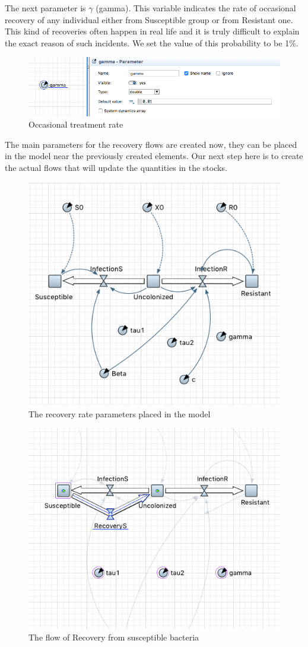The next parameter is $\gamma$ (gamma). This variable indicates the rate of occasional recovery of any individual either from Susceptible group or from Resistant one. This kind of recoveries often happen in real life and it is truly difficult to explain the exact reason of such incidents. We set the value of this probability to be 1\%.

\begin{figure}[H]
  \centering
  \includegraphics[height=0.25\textwidth]{img/screens/recovery/recovery4}
  \caption{Occasional treatment rate}
\end{figure}

The main parameters for the recovery flows are created now, they can be placed in the model near the previously created elements. Our next step here is to create the actual flows that will update the quantities in the stocks.

\begin{figure}[H]
  \centering
  \includegraphics[height=0.5\textwidth]{img/screens/recovery/recovery3}
  \caption{The recovery rate parameters placed in the model}
\end{figure}


\begin{figure}[H]
  \centering
  \includegraphics[height=0.5\textwidth]{img/screens/recovery/recovery6}
  \caption{The flow of Recovery from susceptible bacteria}
\end{figure}

